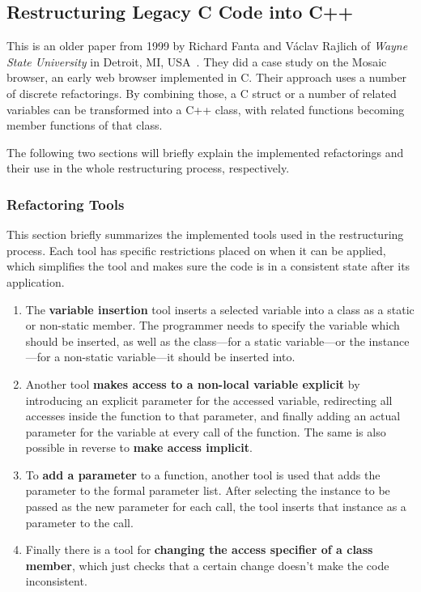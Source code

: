 \documentclass[conference,compsoc,a4paper]{IEEEtran}
\newcommand{\code}[1]{{\small\ttfamily #1}}
\begin{document}
\subsection{Restructuring Legacy C Code into C++} \label{sec:cpp}

This is an older paper from 1999 by Richard Fanta and Václav Rajlich of \emph{Wayne State University} in Detroit, MI, 
USA~\cite{cpp}. They did a case study on the Mosaic browser, an early web browser implemented in C. Their approach uses 
a number of discrete refactorings. By combining those, a C \code{struct} or a number of related variables can be 
transformed into a C++ class, with related functions becoming member functions of that class.

The following two sections will briefly explain the implemented refactorings and their use in the whole restructuring 
process, respectively.

\subsubsection{Refactoring Tools}

This section briefly summarizes the implemented tools used in the restructuring process. Each tool has specific 
restrictions placed on when it can be applied, which simplifies the tool and makes sure the code is in a consistent 
state after its application.

\begin{enumerate}
  \item The \textbf{variable insertion} tool inserts a selected variable into a class as a static or non-static member. 
  The programmer needs to specify the variable which should be inserted, as well as the class---for a static 
  variable---or the instance---for a non-static variable---it should be inserted into.
  
  \item Another tool \textbf{makes access to a non-local variable explicit} by introducing an explicit parameter for 
  the accessed variable, redirecting all accesses inside the function to that parameter, and finally adding an actual 
  parameter for the variable at every call of the function. The same is also possible in reverse to \textbf{make access 
  implicit}.
  
  \item To \textbf{add a parameter} to a function, another tool is used that adds the parameter to the formal parameter 
  list. After selecting the instance to be passed as the new parameter for each call, the tool inserts that instance as 
  a parameter to the call.
  
  \item Finally there is a tool for \textbf{changing the access specifier of a class member}, which just checks that a 
  certain change doesn't make the code inconsistent.
\end{enumerate}
\end{document}
